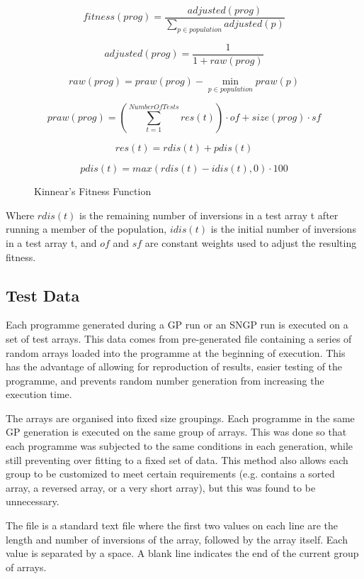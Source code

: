 \documentclass{article}
\begin{document}
\begin{figure}[h]
	$$fitness(prog) = \frac{adjusted(prog)}{\sum_{p\in population}^{}adjusted(p)}$$
	
	$$adjusted(prog) = \frac{1}{1 + raw(prog)}$$
	
	$$raw(prog) = praw(prog) - \min_{p\in population} praw(p)$$
	
	$$praw(prog) = \left(\sum_{t = 1}^{Number Of Tests}res(t)\right) \cdot of + size(prog) \cdot sf$$
	
	$$res(t) = rdis(t) + pdis(t)$$
	
	$$pdis(t) = max(rdis(t) - idis(t), 0) \cdot 100$$
	
	\caption{Kinnear's Fitness Function}
	
	\label{kinnear_fitness}		

\end{figure}
Where $rdis(t)$ is the remaining number of inversions in a test array t after running a member of the population, $idis(t)$ is the initial number of inversions in a test array t, and $of$ and $sf$ are constant weights used to adjust the resulting fitness.

\subsection{Test Data}

Each programme generated during a GP run or an SNGP run is executed on a set of test arrays. This data comes from pre-generated file containing a series of random arrays loaded into the programme at the beginning of execution. This has the advantage of allowing for reproduction of results, easier testing of the programme, and prevents random number generation from increasing the execution time.

The arrays are organised into fixed size groupings. Each programme in the same GP generation is executed on the same group of arrays. This was done so that each programme was subjected to the same conditions in each generation, while still preventing over fitting to a fixed set of data. This method also allows each group to be customized to meet certain requirements (e.g. contains a sorted array, a reversed array, or a very short array), but this was found to be unnecessary.

The file is a standard text file where the first two values on each line are the length and number of inversions of the array, followed by the array itself. Each value is separated by a space. A blank line indicates the end of the current group of arrays.
\end{document}

